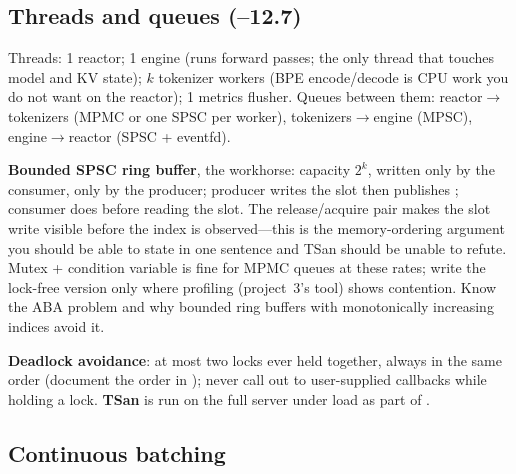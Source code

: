\subsection{Threads and queues (--12.7)}

Threads: 1 reactor; 1 engine (runs forward passes; the only thread that touches model and KV state); $k$ tokenizer workers (BPE encode/decode is CPU work you do not want on the reactor); 1 metrics flusher. Queues between them: reactor$\to$tokenizers (MPMC or one SPSC per worker), tokenizers$\to$engine (MPSC), engine$\to$reactor (SPSC + eventfd).

\textbf{Bounded SPSC ring buffer}, the workhorse: capacity $2^k$,  written only by the consumer,  only by the producer; producer writes the slot then publishes ; consumer does  before reading the slot. The release/acquire pair makes the slot write visible before the index is observed---this is the memory-ordering argument you should be able to state in one sentence and TSan should be unable to refute. Mutex + condition variable is fine for MPMC queues at these rates; write the lock-free version only where profiling (project~3's tool) shows contention. Know the ABA problem and why bounded ring buffers with monotonically increasing indices avoid it.

\textbf{Deadlock avoidance}: at most two locks ever held together, always in the same order (document the order in ); never call out to user-supplied callbacks while holding a lock. \textbf{TSan} is run on the full server under load as part of .

\subsection{Continuous batching}

